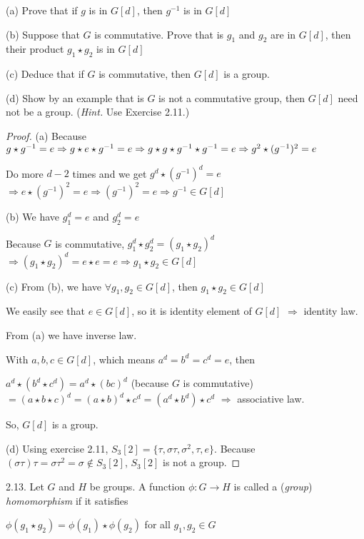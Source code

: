 (a) Prove that if $g$ is in $G[d]$, then $g^{-1}$ is in $G[d]$

(b) Suppose that $G$ is commutative. Prove that is $g_1$ and $g_2$ are in $G[d]$, then their product $g_1 \star g_2$ is in $G[d]$

(c) Deduce that if $G$ is commutative, then $G[d]$ is a group.

(d) Show by an example that is $G$ is not a commutative group, then $G[d]$ need not be a group. (\textit{Hint.} Use Exercise 2.11.)

\begin{proof}
(a) Because $g \star g^{-1} = e \Rightarrow g \star e \star g^{-1} = e \\ \Rightarrow g \star g \star g^{-1} \star g^{-1} = e \Rightarrow g^2 \star (g^{-1})^2 = e$

Do more $d-2$ times and we get $g^d \star (g^{-1})^d = e$ \\ $\Rightarrow e \star (g^{-1})^2 = e \Rightarrow (g^{-1})^2 = e \Rightarrow g^{-1} \in G[d]$

(b) We have $g_1^d = e$ and $g_2^d = e$

Because $G$ is commutative, $g_1^d \star g_2^d = (g_1 \star g_2)^d$ \\ $\Rightarrow (g_1 \star g_2)^d = e \star e = e \Rightarrow g_1 \star g_2 \in G[d]$

(c) From (b), we have $\forall g_1, g_2 \in G[d]$, then $g_1 \star g_2 \in G[d]$

We easily see that $e \in G[d]$, so it is identity element of $G[d]$ $\Rightarrow$ identity law.

From (a) we have inverse law.

With $a, b, c \in G[d]$, which means $a^d = b^d = c^d = e$, then

$a^d \star (b^d \star c^d) = a^d \star (bc)^d$ (because $G$ is commutative) $=(a \star b \star c)^d = (a \star b)^d \star c^d = (a^d \star b^d) \star c^d$ $\Rightarrow$ associative law.

So, $G[d]$ is a group.

(d) Using exercise 2.11, $S_3[2] = \{\tau, \sigma\tau, \sigma^2, \tau, e \}$. Because $(\sigma\tau)\tau = \sigma\tau^2 = \sigma \notin S_3[2]$, $S_3[2]$ is not a group. 
\end{proof}

2.13. Let $G$ and $H$ be groups. A function $\phi: G \rightarrow H$ is called a (\textit{group}) \textit{homomorphism} if it satisfies

\begin{center}
    $\phi(g_1 \star g_2) = \phi(g_1) \star \phi(g_2)$ for all $g_1, g_2 \in G$
\end{center}

